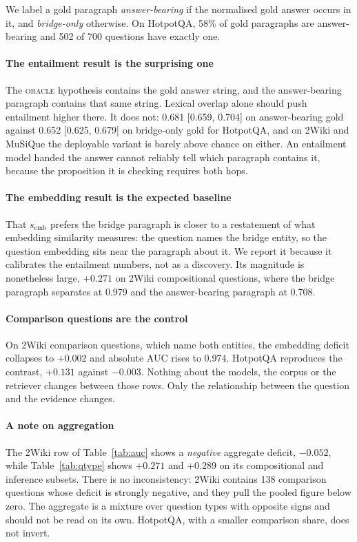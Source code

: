 \documentclass[conference]{IEEEtran}
\newcommand{\semb}{s_{\mathrm{emb}}}
\begin{document}
We label a gold paragraph \emph{answer-bearing} if the normalised gold answer
occurs in it, and \emph{bridge-only} otherwise. On HotpotQA, 58\% of gold
paragraphs are answer-bearing and 502 of 700 questions have exactly one.

\paragraph{The entailment result is the surprising one}
The \textsc{oracle} hypothesis contains the gold answer string, and the
answer-bearing paragraph contains that same string. Lexical overlap alone should
push entailment higher there. It does not: 0.681 [0.659, 0.704] on
answer-bearing gold against 0.652 [0.625, 0.679] on bridge-only gold for
HotpotQA, and on 2Wiki and MuSiQue the deployable variant is barely above
chance on either. An entailment model handed the answer cannot reliably tell
which paragraph contains it, because the proposition it is checking requires
both hops.

\paragraph{The embedding result is the expected baseline}
That $\semb$ prefers the bridge paragraph is closer to a restatement of what
embedding similarity measures: the question names the bridge entity, so the
question embedding sits near the paragraph about it. We report it because it
calibrates the entailment numbers, not as a discovery. Its magnitude is
nonetheless large, $+0.271$ on 2Wiki compositional questions, where the bridge
paragraph separates at 0.979 and the answer-bearing paragraph at 0.708.

\paragraph{Comparison questions are the control}
On 2Wiki comparison questions, which name both entities, the embedding deficit
collapses to $+0.002$ and absolute AUC rises to 0.974. HotpotQA reproduces the
contrast, $+0.131$ against $-0.003$. Nothing about the models, the corpus or the
retriever changes between those rows. Only the relationship between the question
and the evidence changes.

\paragraph{A note on aggregation}
The 2Wiki row of Table~\ref{tab:auc} shows a \emph{negative} aggregate deficit,
$-0.052$, while Table~\ref{tab:qtype} shows $+0.271$ and $+0.289$ on its
compositional and inference subsets. There is no inconsistency: 2Wiki contains
138 comparison questions whose deficit is strongly negative, and they pull the
pooled figure below zero. The aggregate is a mixture over question types with
opposite signs and should not be read on its own. HotpotQA, with a smaller
comparison share, does not invert.
\end{document}
